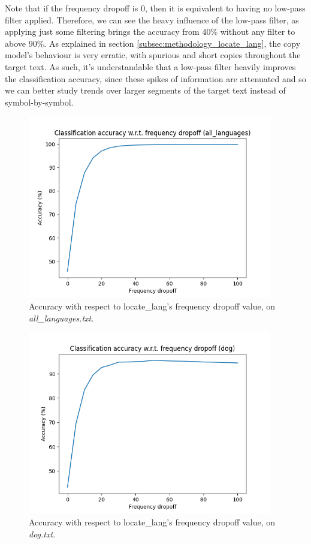 \documentclass{article}
\begin{document}
Note that if the frequency dropoff is 0, then it is equivalent to having no low-pass filter applied.
Therefore, we can see the heavy influence of the low-pass filter, as applying just some filtering brings the accuracy from $40\%$ without any filter to above $90\%$.
As explained in section \ref{subsec:methodology_locate_lang}, the copy model's behaviour is very erratic, with spurious and short copies throughout the target text.
As such, it's understandable that a low-pass filter heavily improves the classification accuracy, since these spikes of information are attenuated and so we can better study trends over larger segments of the target text instead of symbol-by-symbol.

\begin{figure}
    \centering
    \includegraphics[width=0.95\textwidth]{../results/ll_all_languages/ll-f.png}
    \caption{Accuracy with respect to locate_lang's frequency dropoff value, on \textit{all_languages.txt}.}
    \label{fig:ll_f_all_languages}
\end{figure}

\begin{figure}
    \centering
    \includegraphics[width=0.95\textwidth]{../results/ll_dog/ll-f.png}
    \caption{Accuracy with respect to locate_lang's frequency dropoff value, on \textit{dog.txt}.}
    \label{fig:ll_f_dog}
\end{figure}
\end{document}
